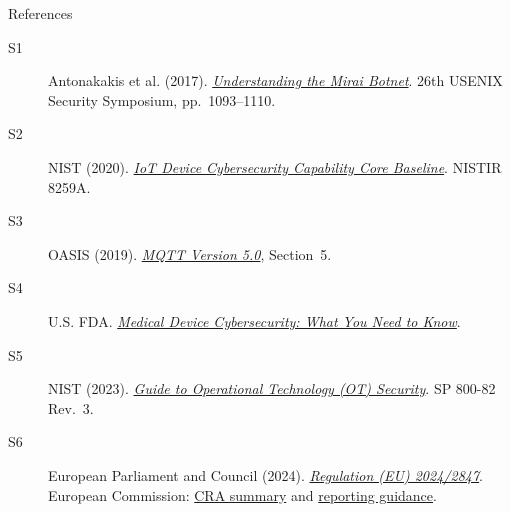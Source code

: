 \documentclass[aspectratio=169,12pt]{beamer}
\begin{document}
\begin{frame}{References}
\fontsize{8.2}{9.4}\selectfont
\begin{description}
\item[S1] Antonakakis et al. (2017).
\href{https://www.usenix.org/conference/usenixsecurity17/technical-sessions/presentation/antonakakis}
{\textit{Understanding the Mirai Botnet}}.
26th USENIX Security Symposium, pp.~1093--1110.

\item[S2] NIST (2020).
\href{https://doi.org/10.6028/NIST.IR.8259A}
{\textit{IoT Device Cybersecurity Capability Core Baseline}}.
NISTIR 8259A.

\item[S3] OASIS (2019).
\href{https://docs.oasis-open.org/mqtt/mqtt/v5.0/os/mqtt-v5.0-os.html}
{\textit{MQTT Version 5.0}}, Section~5.

\item[S4] U.S. FDA.
\href{https://www.fda.gov/consumers/consumer-updates/medical-device-cybersecurity-what-you-need-know}
{\textit{Medical Device Cybersecurity: What You Need to Know}}.

\item[S5] NIST (2023).
\href{https://doi.org/10.6028/NIST.SP.800-82r3}
{\textit{Guide to Operational Technology (OT) Security}}.
SP 800-82 Rev.~3.

\item[S6] European Parliament and Council (2024).
\href{https://eur-lex.europa.eu/legal-content/EN/TXT/PDF/?uri=CELEX:32024R2847}
{\textit{Regulation (EU) 2024/2847}}.
European Commission:
\href{https://digital-strategy.ec.europa.eu/en/policies/cra-summary}{CRA summary}
and \href{https://digital-strategy.ec.europa.eu/en/policies/cra-reporting}{reporting guidance}.
\end{description}
\end{frame}
\end{document}
